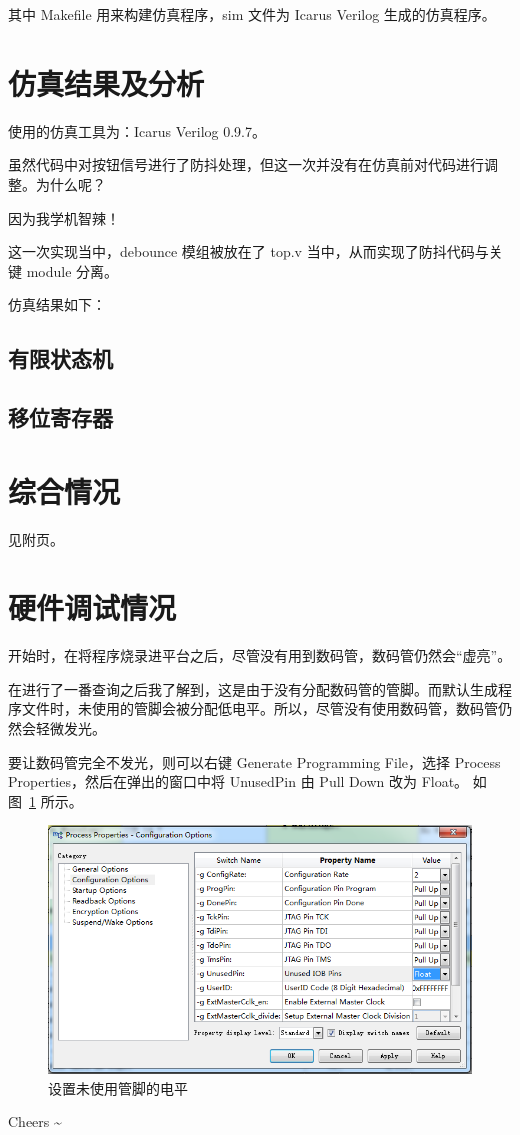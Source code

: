 \documentclass[11pt,a4paper]{article}
\begin{document}
其中 Makefile 用来构建仿真程序，sim 文件为 Icarus Verilog 生成的仿真程序。


\section{仿真结果及分析}
使用的仿真工具为：Icarus Verilog 0.9.7。

虽然代码中对按钮信号进行了防抖处理，但这一次并没有在仿真前对代码进行调整。为什么呢？

因为我学机智辣！

这一次实现当中，debounce 模组被放在了 top.v 当中，从而实现了防抖代码与关键 module 分离。

仿真结果如下：

\subsection{有限状态机}

\subsection{移位寄存器}

\section{综合情况}
见附页。

\section{硬件调试情况}
开始时，在将程序烧录进平台之后，尽管没有用到数码管，数码管仍然会“虚亮”。

在进行了一番查询之后我了解到，这是由于没有分配数码管的管脚。而默认生成程序文件时，未使用的管脚会被分配低电平。所以，尽管没有使用数码管，数码管仍然会轻微发光。

要让数码管完全不发光，则可以右键 Generate Programming File，选择 Process Properties，然后在弹出的窗口中将 UnusedPin 由 Pull Down 改为 Float。
如图~\ref{fig:设置未使用管脚的电平} 所示。

\begin{figure}[htb]
  \centering
    \includegraphics[width=\textwidth]{configure}
  \caption{设置未使用管脚的电平}
  \label{fig:设置未使用管脚的电平}
\end{figure}

Cheers \textasciitilde



\end{document}

